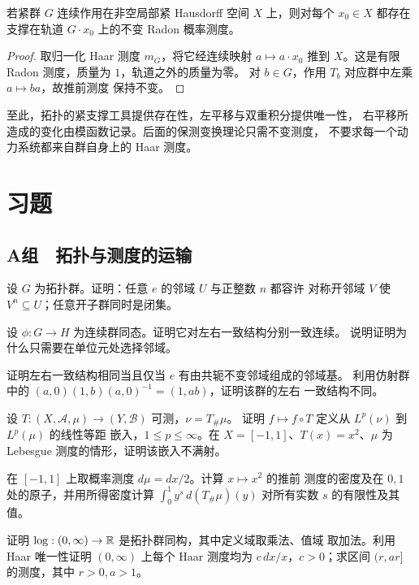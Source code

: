 \begin{corollary}[紧群作用的平均]
\label{cor:compact-group-orbit-average}
若紧群 $G$ 连续作用在非空局部紧 Hausdorff 空间 $X$ 上，则对每个
$x_0\in X$ 都存在支撑在轨道 $G\cdot x_0$ 上的不变 Radon 概率测度。
\end{corollary}

\begin{proof}
取归一化 Haar 测度 $m_G$，将它经连续映射 $a\mapsto a\cdot x_0$
推到 $X$。这是有限 Radon 测度，质量为 $1$，轨道之外的质量为零。
对 $b\in G$，作用 $T_b$ 对应群中左乘 $a\mapsto ba$，故推前测度
保持不变。
\end{proof}

至此，拓扑的紧支撑工具提供存在性，左平移与双重积分提供唯一性，
右平移所造成的变化由模函数记录。后面的保测变换理论只需不变测度，
不要求每一个动力系统都来自群自身上的 Haar 测度。

\section*{习题}

\subsection*{A组　拓扑与测度的运输}
\begin{enumerate}[label=\textbf{\thechapter.\arabic*.}]
设 $G$ 为拓扑群。证明：任意 $e$ 的邻域 $U$ 与正整数 $n$ 都容许
对称开邻域 $V$ 使 $V^n\subseteq U$；任意开子群同时是闭集。

设 $\phi:G\to H$ 为连续群同态。证明它对左右一致结构分别一致连续。
说明证明为什么只需要在单位元处选择邻域。

证明左右一致结构相同当且仅当 $e$ 有由共轭不变邻域组成的邻域基。
利用仿射群中的 $(a,0)(1,b)(a,0)^{-1}=(1,ab)$，证明该群的左右
一致结构不同。

设 $T:(X,\mathcal A,\mu)\to(Y,\mathcal B)$ 可测，$\nu=T_\#\mu$。
证明 $f\mapsto f\circ T$ 定义从 $L^p(\nu)$ 到 $L^p(\mu)$ 的线性等距
嵌入，$1\le p\le\infty$。在 $X=[-1,1]$、$T(x)=x^2$、$\mu$ 为
Lebesgue 测度的情形，证明该嵌入不满射。

在 $[-1,1]$ 上取概率测度 $d\mu=dx/2$。计算 $x\mapsto x^2$ 的推前
测度的密度及在 $0,1$ 处的原子，并用所得密度计算
$\int_0^1y^s\,d(T_\#\mu)(y)$ 对所有实数 $s$ 的有限性及其值。

证明 $\log:(0,\infty)\to\mathbb{R}$ 是拓扑群同构，其中定义域取乘法、值域
取加法。利用 Haar 唯一性证明 $(0,\infty)$ 上每个 Haar 测度均为
$c\,dx/x$，$c>0$；求区间 $(r,ar]$ 的测度，其中 $r>0,a>1$。
\end{enumerate}

